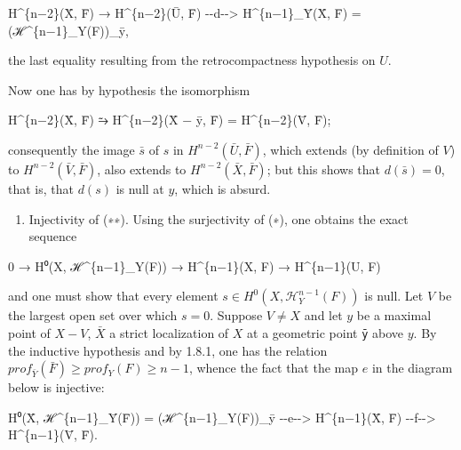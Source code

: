 \documentclass[
]{article}
\newenvironment{Shaded}{}{}
\newcommand{\NormalTok}[1]{#1}
\providecommand{\tightlist}{%
  \setlength{\itemsep}{0pt}\setlength{\parskip}{0pt}}
\begin{document}
\begin{Shaded}
\begin{Highlighting}[]
\NormalTok{H\^{}\{n−2\}(X̄, F̄) → H\^{}\{n−2\}(Ū, F̄) {-}{-}d{-}{-}\textgreater{} H\^{}\{n−1\}\_Ȳ(X̄, F̄) = (ℋ\^{}\{n−1\}\_Y(F))\_ȳ,}
\end{Highlighting}
\end{Shaded}

the last equality resulting from the retrocompactness hypothesis on
\(U\).

Now one has by hypothesis the isomorphism

\begin{Shaded}
\begin{Highlighting}[]
\NormalTok{H\^{}\{n−2\}(X̄, F̄) ⥲ H\^{}\{n−2\}(X̄ − ȳ, F̄) = H\^{}\{n−2\}(V̄, F̄);}
\end{Highlighting}
\end{Shaded}

consequently the image \(\bar{s}\) of \(s\) in
\(H^{n-2}(\bar{U}, \bar{F})\), which extends (by definition of \(V\)) to
\(H^{n-2}(\bar{V}, \bar{F})\), also extends to
\(H^{n-2}(\bar{X}, \bar{F})\); but this shows that \(d(\bar{s}) = 0\),
that is, that \(d(s)\) is null at \(y\), which is absurd.

\begin{enumerate}
\def\labelenumi{\alph{enumi})}
\setcounter{enumi}{1}
\tightlist
\item
  Injectivity of (∗∗). Using the surjectivity of (∗), one obtains the
  exact sequence
\end{enumerate}

\begin{Shaded}
\begin{Highlighting}[]
\NormalTok{0 → H⁰(X, ℋ\^{}\{n−1\}\_Y(F)) → H\^{}\{n−1\}(X, F) → H\^{}\{n−1\}(U, F)}
\end{Highlighting}
\end{Shaded}

and one must show that every element
\(s \in H^{0}(X, \mathcal{H}^{n-1}_{Y}(F))\) is null. Let \(V\) be the
largest open set over which \(s = 0\). Suppose \(V \neq X\) and let
\(y\) be a maximal point of \(X - V\), \(\bar{X}\) a strict localization
of \(X\) at a geometric point \texttt{ȳ} above \(y\). By the inductive
hypothesis and by 1.8.1, one has the relation
\(prof_{\bar{Y}}(\bar{F}) \geqslant prof_{Y}(F) \geqslant n - 1\),
whence the fact that the map \(e\) in the diagram below is injective:

\begin{Shaded}
\begin{Highlighting}[]
\NormalTok{H⁰(X̄, ℋ\^{}\{n−1\}\_Ȳ(F̄)) = (ℋ\^{}\{n−1\}\_Y(F))\_ȳ {-}{-}e{-}{-}\textgreater{} H\^{}\{n−1\}(X̄, F̄) {-}{-}f{-}{-}\textgreater{} H\^{}\{n−1\}(V̄, F̄).}
\end{Highlighting}
\end{Shaded}
\end{document}
